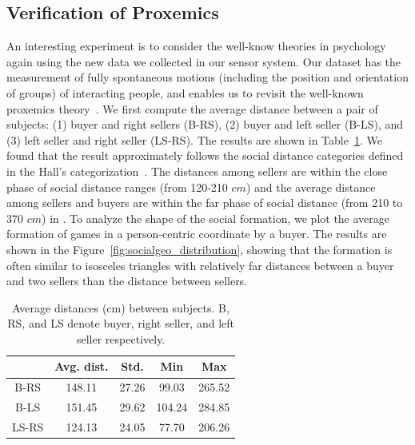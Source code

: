 \subsection{Verification of Proxemics}
An interesting experiment is to consider the well-know theories in psychology again using the new data we collected in our sensor system. Our dataset has the measurement of fully spontaneous motions (including the position and orientation of groups) of interacting people, and enables us to revisit the well-known proxemics theory~\cite{Hall66}. We first compute the average distance between a pair of subjects: (1) buyer and right sellers (B-RS), (2) buyer and left seller (B-LS), and (3) left seller and right seller (LS-RS). The results are shown in Table~\ref{table:proxemics_comp}. We found that the result approximately follows the social distance categories defined in the Hall's categorization~\cite{Hall66}. The distances among sellers are within the close phase of social distance ranges (from 120-210 $cm$) and the average distance among sellers and buyers are within the far phase of social distance (from 210 to 370 $cm$) in \cite{Hall66}. To analyze the shape of the social formation, we plot the average formation of games in a person-centric coordinate by a buyer. The results are shown in the Figure~\ref{fig:socialgeo_distribution}, showing that the formation is often similar to isosceles triangles with relatively far distances between a buyer and two sellers than the distance between sellers. 


\begin{table}[t]
	\centering
	\caption{Average distances (cm) between subjects. B, RS, and LS denote buyer, right seller, and left seller respectively.}
	\label{table:proxemics_comp}
	\begin{tabular}{c| c| c| c| c}
		\hline
		& Avg. dist. & Std. & Min & Max \\
		\hline
		B-RS & 148.11 & 27.26 & 99.03 & 265.52 \\
		\hline
		B-LS & 151.45 & 29.62 & 104.24  & 284.85 \\
		\hline
		LS-RS & 124.13 & 24.05  & 77.70  & 206.26 \\
		\hline
	\end{tabular}
\end{table}

